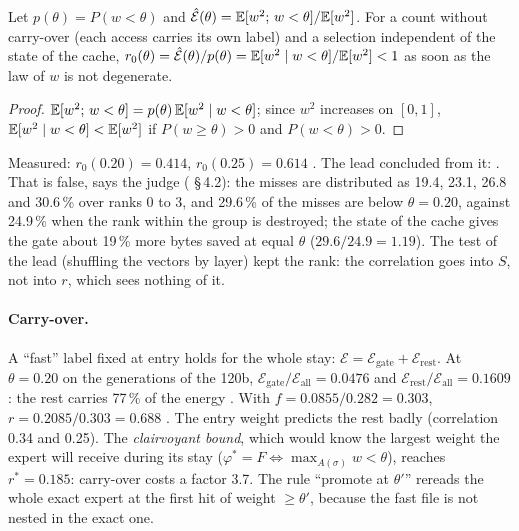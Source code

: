 \begin{proposition}\label{t3mim:prop:p6-porte}
Let $p(\theta) = P(w < \theta)$ and $\hat{\mathcal E}(\theta) = \mathbb{E}[w^2 ;\, w < \theta] / \mathbb{E}[w^2]$. For a count without carry-over (each access carries its own label) and a selection independent of the state of the cache, $r_0(\theta) = \hat{\mathcal E}(\theta)/p(\theta) = \mathbb{E}[w^2 \mid w < \theta]/\mathbb{E}[w^2] < 1$ as soon as the law of $w$ is not degenerate.
\end{proposition}
\begin{proof}
$\mathbb{E}[w^2;\, w<\theta] = p(\theta)\,\mathbb{E}[w^2 \mid w < \theta]$; since $w^2$ increases on $[0, 1]$, $\mathbb{E}[w^2 \mid w < \theta] < \mathbb{E}[w^2]$ if $P(w \ge \theta) > 0$ and $P(w<\theta)>0$.
\end{proof}
Measured: $r_0(0.20) = 0.414$, $r_0(0.25) = 0.614$ \mes. The lead concluded from it: . That is false, says the judge ( §\,4.2): the misses are distributed as 19.4, 23.1, 26.8 and 30.6\,\% over ranks 0 to 3, and 29.6\,\% of the misses are below $\theta = 0.20$, against 24.9\,\% when the rank within the group is destroyed; the state of the cache gives the gate about 19\,\% more bytes saved at equal $\theta$ ($29.6/24.9 = 1.19$). The test of the lead (shuffling the vectors by layer) kept the rank: the correlation goes into $S$, not into $r$, which sees nothing of it.

\paragraph{Carry-over.} A ``fast'' label fixed at entry holds for the whole stay: $\mathcal E = \mathcal E_{\text{gate}} + \mathcal E_{\text{rest}}$. At $\theta = 0.20$ on the generations of the 120b, $\mathcal E_{\text{gate}}/\mathcal E_{\text{all}} = 0.0476$ and $\mathcal E_{\text{rest}}/\mathcal E_{\text{all}} = 0.1609$: the rest carries 77\,\% of the energy \mes. With $f = 0.0855/0.282 = 0.303$, $r = 0.2085/0.303 = 0.688$ \calc. The entry weight predicts the rest badly (correlation 0.34 and 0.25). The \emph{clairvoyant bound}, which would know the largest weight the expert will receive during its stay ($\varphi^\ast = F \iff \max_{A(\sigma)} w < \theta$), reaches $r^\ast = 0.185$: carry-over costs a factor 3.7. The rule ``promote at $\theta'$'' rereads the whole exact expert at the first hit of weight $\ge \theta'$, because the fast file is not nested in the exact one.

